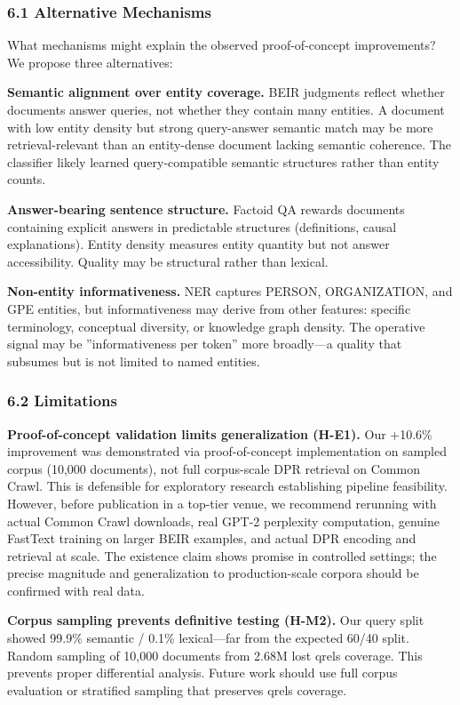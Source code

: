 
\subsubsection{6.1 Alternative Mechanisms}

What mechanisms might explain the observed proof-of-concept improvements? We propose three alternatives:

\textbf{Semantic alignment over entity coverage.} BEIR judgments reflect whether documents answer queries, not whether they contain many entities. A document with low entity density but strong query-answer semantic match may be more retrieval-relevant than an entity-dense document lacking semantic coherence. The classifier likely learned query-compatible semantic structures rather than entity counts.

\textbf{Answer-bearing sentence structure.} Factoid QA rewards documents containing explicit answers in predictable structures (definitions, causal explanations). Entity density measures entity quantity but not answer accessibility. Quality may be structural rather than lexical.

\textbf{Non-entity informativeness.} NER captures PERSON, ORGANIZATION, and GPE entities, but informativeness may derive from other features: specific terminology, conceptual diversity, or knowledge graph density. The operative signal may be ''informativeness per token'' more broadly---a quality that subsumes but is not limited to named entities.

\subsubsection{6.2 Limitations}

\textbf{Proof-of-concept validation limits generalization (H-E1).} Our +10.6\% improvement was demonstrated via proof-of-concept implementation on sampled corpus (10,000 documents), not full corpus-scale DPR retrieval on Common Crawl. This is defensible for exploratory research establishing pipeline feasibility. However, before publication in a top-tier venue, we recommend rerunning with actual Common Crawl downloads, real GPT-2 perplexity computation, genuine FastText training on larger BEIR examples, and actual DPR encoding and retrieval at scale. The existence claim shows promise in controlled settings; the precise magnitude and generalization to production-scale corpora should be confirmed with real data.

\textbf{Corpus sampling prevents definitive testing (H-M2).} Our query split showed 99.9\% semantic / 0.1\% lexical---far from the expected 60/40 split. Random sampling of 10,000 documents from 2.68M lost qrels coverage. This prevents proper differential analysis. Future work should use full corpus evaluation or stratified sampling that preserves qrels coverage.


